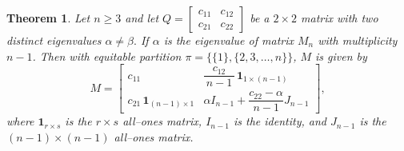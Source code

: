 \documentclass[10pt,a4paper]{amsart}
\newtheorem{theorem}{Theorem}
\begin{document}
\begin{theorem}\label{thm:n-by-n-two-eigs}
	Let $n\ge 3$ and let $Q=\begin{bmatrix} c_{11} & c_{12} \\ c_{21} & c_{22} \end{bmatrix}$
	be a $2\times 2$ matrix with two distinct eigenvalues $ \alpha\neq\beta.$ If $\alpha$ is the eigenvalue of matrix $M_{n}$ with multiplicity $n-1$. Then  with equitable  partition $\pi=\bigl\{\{1\},\{2,3,\dots,n\}\bigr\}$, $M$ is given by
	\begin{equation}\label{eq:Mn-two-eigs}
		M
		=
		\begin{bmatrix}
			c_{11} & \dfrac{c_{12}}{\,n-1\,}\,\mathbf{1}_{1\times (n-1)}\\
			c_{21}\,\mathbf{1}_{(n-1)\times 1} & \alpha I_{n-1} + \dfrac{c_{22}-\alpha}{\,n-1\,}J_{n-1}
		\end{bmatrix},
	\end{equation}
	where $\mathbf{1}_{r\times s}$ is the $r\times s$ all--ones matrix, $I_{n-1}$ is the identity, and
	$J_{n-1}$ is the $(n-1)\times(n-1)$ all--ones matrix.
\end{theorem}
\end{document}
